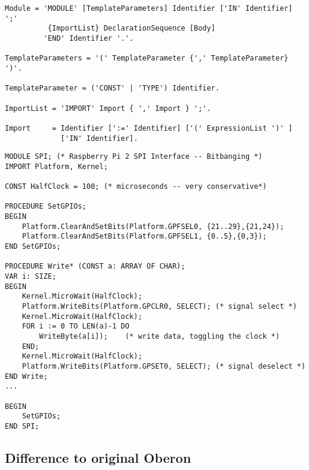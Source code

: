 \documentclass[a4wide,11pt]{article}
\begin{document}
\begin{lstlisting}[style=ebnf]
Module = 'MODULE' [TemplateParameters] Identifier ['IN' Identifier]  ';'
          {ImportList} DeclarationSequence [Body]
         'END' Identifier '.'.

TemplateParameters = '(' TemplateParameter {',' TemplateParameter} ')'.

TemplateParameter = ('CONST' | 'TYPE') Identifier.

ImportList = 'IMPORT' Import { ',' Import } ';'.

Import     = Identifier [':=' Identifier] ['(' ExpressionList ')' ]
             ['IN' Identifier].
\end{lstlisting}

\begin{annotation}

\begin{lstlisting}[style=example, caption=Example of a module (excerpt)]
MODULE SPI; (* Raspberry Pi 2 SPI Interface -- Bitbanging *)
IMPORT Platform, Kernel;

CONST HalfClock = 100; (* microseconds -- very conservative*)

PROCEDURE SetGPIOs;
BEGIN
	Platform.ClearAndSetBits(Platform.GPFSEL0, {21..29},{21,24});
	Platform.ClearAndSetBits(Platform.GPFSEL1, {0..5},{0,3});
END SetGPIOs;

PROCEDURE Write* (CONST a: ARRAY OF CHAR);
VAR i: SIZE;
BEGIN
	Kernel.MicroWait(HalfClock);
	Platform.WriteBits(Platform.GPCLR0, SELECT); (* signal select *)
	Kernel.MicroWait(HalfClock);
	FOR i := 0 TO LEN(a)-1 DO
		WriteByte(a[i]); 	(* write data, toggling the clock *)
	END;
	Kernel.MicroWait(HalfClock);
	Platform.WriteBits(Platform.GPSET0, SELECT); (* signal deselect *)
END Write;
...

BEGIN
	SetGPIOs;
END SPI;
\end{lstlisting}

\subsection{Difference to original Oberon}


\end{annotation}
\end{document}
